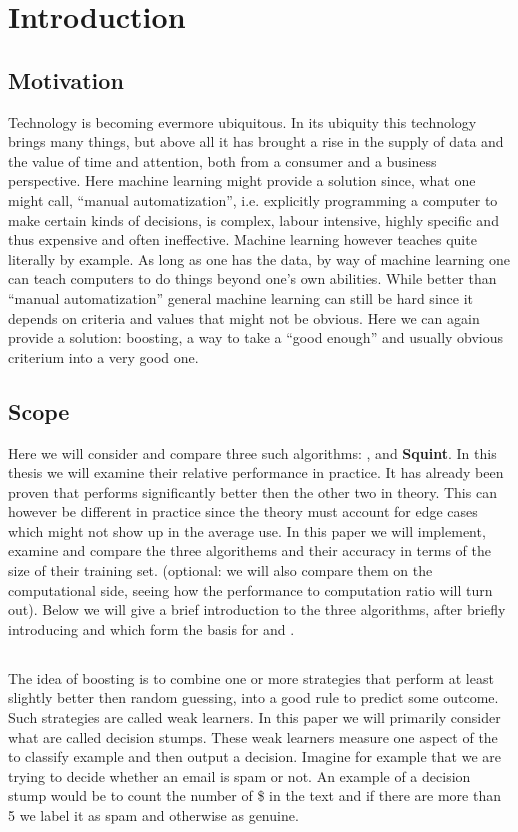 
\chapter{Introduction}
\label{chap:intro}
\section{Motivation}
\label{sec:motiv}

Technology is becoming evermore ubiquitous. In its ubiquity this technology brings many things, but above all it has brought a rise in the supply of data and the value of time and attention, both from a consumer and a business perspective. Here machine learning might provide a solution since, what one might call, ``manual automatization'', i.e. explicitly programming a computer to make certain kinds of decisions, is complex, labour intensive, highly specific and thus expensive and often ineffective. Machine learning however teaches quite literally by example. As long as one has the data, by way of machine learning one can teach computers to do things beyond one's own abilities. While better than ``manual automatization'' general machine learning can still be hard since it depends on criteria and values that might not be obvious. Here we can again provide a solution: boosting, a way to take a ``good enough'' and usually obvious criterium into a very good one.

\section{Scope} Here we will consider and compare three such algorithms: \adaB, \adaN and \textbf{Squint}. In this thesis we will examine their relative performance in practice. It has already been proven that \squint performs significantly better then the other two in theory. This can however be different in practice since the theory must account for edge cases which might not show up in the average use. In this paper we will implement, examine and compare the three algorithems and their accuracy in terms of the size of their training set. (optional: we will also compare them on the computational side, seeing how the performance to computation ratio will turn out). Below we will give a brief introduction to the three algorithms, after briefly introducing \hedge and \weak which form the basis for \adaB and \adaN.

\section{\weak}
The idea of boosting is to combine one or more strategies that perform at least slightly better then random guessing, into a good rule to predict some outcome. Such strategies are called weak learners. In this paper we will primarily consider what are called decision stumps. These weak learners measure one aspect of the to classify example and then output a decision. Imagine for example that we are trying to decide whether an email is spam or not. An example of a decision stump would be to count the number of \$ in the text and if there are more than 5 we label it as spam and otherwise as genuine. 

